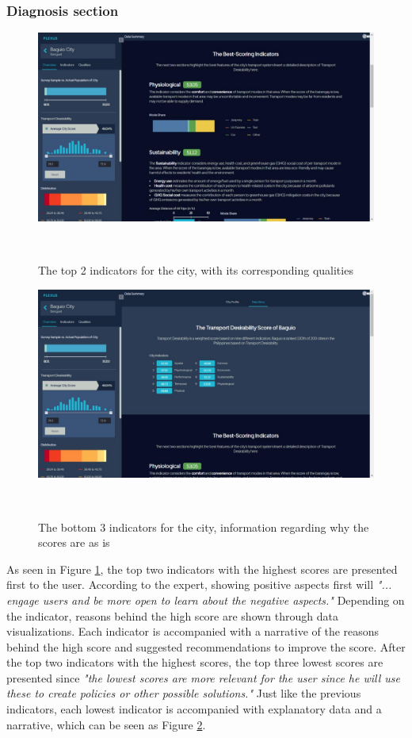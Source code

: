 \documentclass{sigchi}
\begin{document}
\subsubsection{Diagnosis section}
\begin{figure}
\centering
  \includegraphics[width=0.9\columnwidth]{figures/latest-screens/city-2.jpg}
  \caption{The top 2 indicators for the city, with its corresponding qualities}~\label{fig:Diagnosis}
\end{figure}

\begin{figure}
\centering
  \includegraphics[width=0.9\columnwidth]{figures/latest-screens/city-3.jpg}
  \caption{The bottom 3 indicators for the city, information regarding why the scores are as is}~\label{fig:Diagnosis2}
\end{figure}

As seen in Figure \ref{fig:Diagnosis}, the top two indicators with the highest scores are presented first to the user. According to the expert, showing positive aspects first will \textit{"... engage users and be more open to learn about the negative aspects."} Depending on the indicator, reasons behind the high score are shown through data visualizations. Each indicator is accompanied with a narrative of the reasons behind the high score and suggested recommendations to improve the score. After the top two indicators with the highest scores, the top three lowest scores are presented since \textit{"the lowest scores are more relevant for the user since he will use these to create policies or other possible solutions."} Just like the previous indicators, each lowest indicator is accompanied with explanatory data and a narrative, which can be seen as Figure \ref{fig:Diagnosis2}. 
\end{document}
